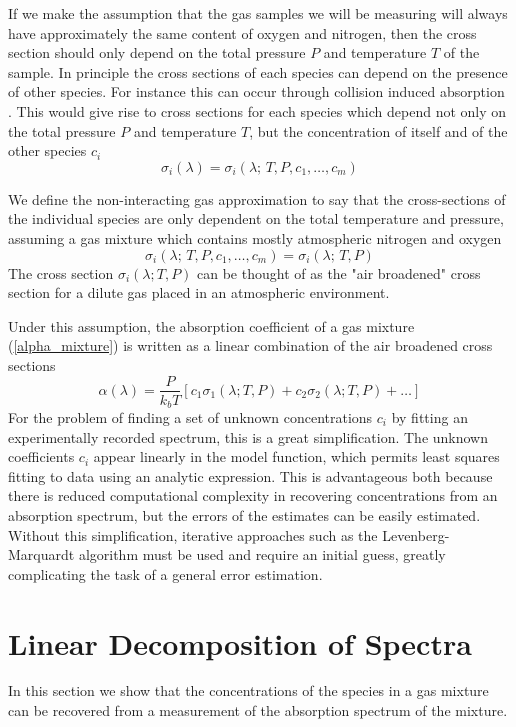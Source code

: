 \documentclass[12pt]{report}
\begin{document}
	If we make the assumption that the gas samples we will be measuring will always have approximately the same content of oxygen and nitrogen, then the cross section should only depend on the total pressure $P$ and temperature $T$ of the sample. In principle the cross sections of each species can depend on the presence of other species. For instance this can occur through collision induced absorption \cite{hitran_cia_2019}. This would give rise to cross sections for each species which depend not only on the total pressure $P$ and temperature $T$, but the concentration of itself and of the other species $c_i$
	\begin{equation*}
		\sigma_i(\lambda) = \sigma_i(\lambda ;\,T, P,c_1, \ldots, c_m)
	\end{equation*}
	
	We define the non-interacting gas approximation to say that the cross-sections of the individual species are only dependent on the total temperature and pressure, assuming a gas mixture which contains mostly atmospheric nitrogen and oxygen
	\begin{equation}
		\sigma_i(\lambda ;\,T, P,c_1, \ldots, c_m) = \sigma_i(\lambda ;\,T, P)
	\end{equation}
	The cross section $\sigma_i(\lambda; T, P)$ can be thought of as the "air broadened" cross section for a dilute gas placed in an atmospheric environment.
	
	Under this assumption, the absorption coefficient of a gas mixture (\ref{alpha_mixture}) is written as a linear combination of the air broadened cross sections
	\begin{equation} \label{alpha_dilute}
		\alpha(\lambda) = \frac{P}{k_b T} \left[c_1\sigma_1(\lambda; T, P) + c_2 \sigma_2(\lambda; T, P) + \ldots \right]
	\end{equation}
	For the problem of finding a set of unknown concentrations $c_i$ by fitting an experimentally recorded spectrum, this is a great simplification. The unknown coefficients $c_i$ appear linearly in the model function, which permits least squares fitting to data using an analytic expression. This is advantageous both because there is reduced computational complexity in recovering concentrations from an absorption spectrum, but the errors of the estimates can be easily estimated. Without this simplification, iterative approaches such as the Levenberg-Marquardt algorithm must be used and require an initial guess, greatly complicating the task of a general error estimation.
	
	\section{Linear Decomposition of Spectra}
	In this section we show that the concentrations of the species in a gas mixture can be recovered from a measurement of the absorption spectrum of the mixture. 
	
\end{document}
